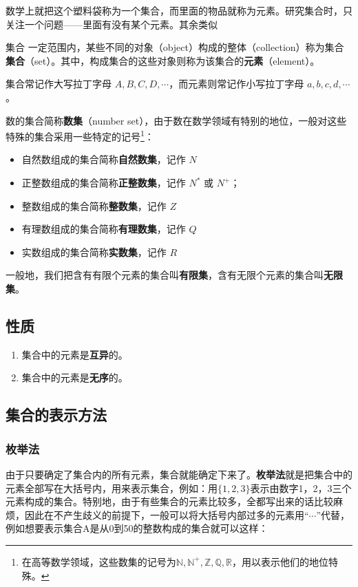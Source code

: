 数学上就把这个塑料袋称为一个集合，而里面的物品就称为元素。研究集合时，只关注一个问题——里面有没有某个元素。其余类似



\begin{definition}{集合}
一定范围内，某些不同的对象（object）构成的整体（collection）称为集合\textbf{集合}（set）。其中，构成集合的这些对象则称为该集合的\textbf{元素}（element）。

集合常记作大写拉丁字母 $A,B,C,D,\cdots$，而元素则常记作小写拉丁字母 $a,b,c,d,\cdots$ 。
\end{definition}

数的集合简称\textbf{数集}（number set），由于数在数学领域有特别的地位，一般对这些特殊的集合采用一些特定的记号\footnote{在高等数学领域，这些数集的记号为$\mathbb{N,N^+,Z,Q,R}$，用以表示他们的地位特殊。}：
\begin{itemize}
\item 自然数组成的集合简称\textbf{自然数集}，记作 $N$
\item 正整数组成的集合简称\textbf{正整数集}，记作 $N^{*}$ 或 $N^{+}$； 
\item 整数组成的集合简称\textbf{整数集}，记作 $Z$
\item 有理数组成的集合简称\textbf{有理数集}，记作 $Q$
\item 实数组成的集合简称\textbf{实数集}，记作 $R$
\end{itemize}

一般地，我们把含有有限个元素的集合叫\textbf{有限集}，含有无限个元素的集合叫\textbf{无限集}。


\subsection{性质}
\begin{enumerate}
\item 集合中的元素是\textbf{互异}的。
\item 集合中的元素是\textbf{无序}的。
\end{enumerate}



\subsection{集合的表示方法}

\subsubsection{枚举法}

由于只要确定了集合内的所有元素，集合就能确定下来了。\textbf{枚举法}就是把集合中的元素全部写在大括号内，用来表示集合，例如：用$\{1,2,3\}$表示由数字1，2，3三个元素构成的集合。特别地，由于有些集合的元素比较多，全都写出来的话比较麻烦，因此在不产生歧义的前提下，一般可以将大括号内部过多的元素用“$\cdots$”代替，例如想要表示集合A是从0到50的整数构成的集合就可以这样：

